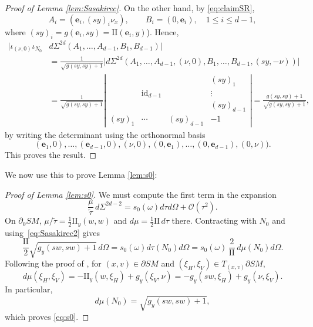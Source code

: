 \documentclass[JEP,XML,SOM,Unicode,NoFloatCountersInSection, NoEqCountersInSection,published]{cedram}
\let\cal\mathcal
\theoremstyle{plain}
\theoremstyle{definition}
\theoremstyle{remark}
\def\t{\tilde{\tau}}
\def\two{\mathrm{II}}
\newcommand{\be}{{\boldsymbol{e}}}
\begin{document}
\begin{proof}[Proof of Lemma \ref{lem:Sasakirec}]
On the other hand, by \eqref{eq:claimSR},\vspace*{-3pt}
\begin{equation*}
A_i = (\be_i, (sy)_i \nu_x), \qquad B_i = (0,\be_i), \quad 1\le i\le d-1,
\end{equation*}
where $(sy)_i = g(\be_i, sy) = \two(\be_i,y)$). Hence,\vspace*{-3pt}
\begin{align*}
\bigl|\iota_{(\nu,0)} \iota_{N_0} &d\Sigma^{2d} (A_1,\dots,A_{d-1}, B_1, B_{d-1})\bigr| \\
&= \frac{1}{\sqrt{g(sy,sy)+1}} \bigl|d\Sigma^{2d} (A_1,\dots,A_{d-1}, (\nu,0), B_1,\dots, B_{d-1}, (sy,-\nu))\bigr| \\
&= \frac{1}{\sqrt{g(sy,sy)+1}} \left|
\begin{array}{ccc|c}
& & & (sy)_1 \\
& \mathrm{id}_{d-1} & & \vdots \\
& & & (sy)_{d-1} \\
\hline
(sy)_1 & \cdots & (sy)_{d-1} & -1
\end{array}
\right| = \frac{g(sy,sy)+1}{\sqrt{g(sy,sy)+1}},
\end{align*}
by writing the determinant using the orthonormal basis\vspace*{-3pt}
\begin{equation*}
(\be_1,0), \dots, (\be_{d-1},0), (\nu,0), (0,\be_1), \dots, (0,\be_{d-1}),(0,\nu)).
\end{equation*}
This proves the result.
\end{proof}

We now use this to prove Lemma \ref{lem:s0}:

\begin{proof}[Proof of Lemma \ref{lem:s0}] We must compute the first term in the expansion
\begin{equation*}
\frac{\mu}{\t}\, d\Sigma^{2d-2} = s_0(\omega) d\tau d\Omega + {\cal O}(\tau^2).
\end{equation*}
On $\partial_0 SM$, $\mu/\t \!=\! \frac12 \two_y(w,w)$ and $d\mu \!=\! \frac12 \two\, d\tau$ there. Contracting
with $N_0$ and using~\eqref{eq:Sasakirec2} gives
\begin{equation*}
\frac{\two}{2} \sqrt{g_y(sw,sw)+1}\,d\Omega = s_0 (\omega) d\tau(N_0) d\Omega = s_0(\omega)\, \frac{2}{\two}\, d\mu(N_0) d\Omega.
\end{equation*}
Following the proof of \cite[Lem.\,3.3.6]{Paternain2021}, for $(x,v)\in \partial SM$ and $(\xi_H,\xi_V) \in T_{(x,v)} \partial SM$,
\begin{equation*}
d\mu (\xi_H, \xi_V) = - \two_y (w,\xi_H) + g_y(\xi_V, \nu) = - g_y(sw, \xi_H) + g_y(\nu, \xi_V).
\end{equation*}
In particular,
\begin{equation*}
d\mu(N_0) = \sqrt{g_y(sw,sw) + 1},
\end{equation*}
which proves \eqref{eq:s0}.
\end{proof}
\end{document}
